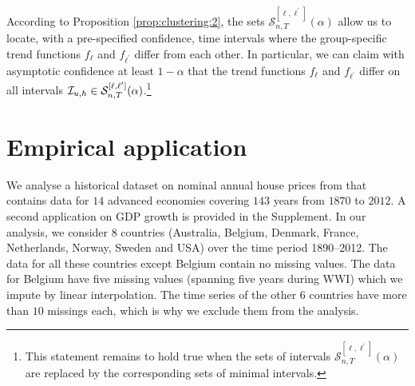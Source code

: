 \documentclass[12pt]{article}
\begin{document}
According to Proposition \ref{prop:clustering:2}, the sets $\mathcal{S}^{[\ell,\ell^\prime]}_{n, T}(\alpha)$ allow us to locate, with a pre-specified confidence, time intervals where the group-specific trend functions $f_\ell$ and $f_{\ell^\prime}$ differ from each other. In particular, we can claim with asymptotic confidence at least $1 - \alpha$ that the trend functions $f_\ell$ and $f_{\ell^\prime}$ differ on all intervals $\mathcal{I}_{u, h} \in \mathcal{S}^{[\ell,\ell^\prime]}_{n, T}(\alpha)$.\footnote{This statement remains to hold true when the sets of intervals $\mathcal{S}^{[\ell,\ell^\prime]}_{n, T}(\alpha)$ are replaced by the corresponding sets of minimal intervals.} 

\section{Empirical application}\label{sec:app}


We analyse a historical dataset on nominal annual house prices from \cite{Knoll2017} that contains data for $14$ advanced economies covering $143$ years from $1870$ to $2012$. 
A second application on GDP growth is provided in the Supplement. 
In our analysis, we consider 8 countries (Australia, Belgium, Denmark, France, Netherlands, Norway, Sweden and USA) over the time period 1890--2012. The data for all these countries except Belgium contain no missing values. The data for Belgium have five missing values (spanning five years during WWI) 
which we impute by linear interpolation. The time series of the other $6$ countries have more than $10$ missings each, which is why we exclude them from the analysis.
\end{document}

